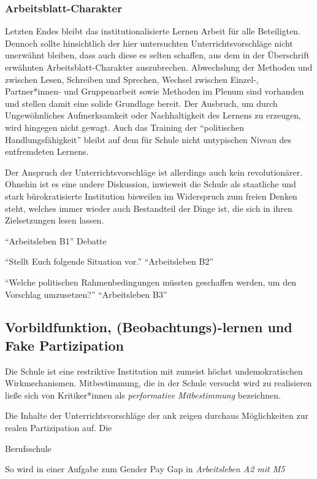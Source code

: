 \subsubsection{Arbeitsblatt-Charakter}
Letzten Endes bleibt das institutionalisierte Lernen Arbeit für alle Beteiligten. Dennoch sollte hinsichtlich der hier untersuchten Unterrichtsvorschläge nicht unerwähnt bleiben, dass auch diese es selten schaffen, aus dem in der Überschrift erwähnten Arbeitsblatt-Charakter auszubrechen. Abwechslung der Methoden und zwischen Lesen, Schreiben und Sprechen, Wechsel zwischen Einzel-, Partner*innen- und Gruppenarbeit sowie Methoden im Plenum sind vorhanden und stellen damit eine solide Grundlage bereit. Der Ausbruch, um durch Ungewöhnliches Aufmerksamkeit oder Nachhaltigkeit des Lernens zu erzeugen, wird hingegen nicht gewagt. 
Auch das Training der \enquote{politischen Handlungsfähigkeit} bleibt auf dem für Schule nicht untypischen Niveau des entfremdeten Lernens. 

Der Anspruch der Unterrichtsvorschläge ist allerdings auch kein revolutionärer. Ohnehin ist es eine andere Diskussion, inwieweit die Schule als staatliche und stark bürokratisierte Institution bisweilen im Widerspruch zum freien Denken steht, welches immer wieder auch Bestandteil der Dinge ist, die sich in ihren Zielsetzungen lesen lassen. 

\enquote{Arbeitsleben B1} Debatte

\enquote{Stellt Euch folgende Situation vor.} \enquote{Arbeitsleben B2}

\enquote{Welche politischen Rahmenbedingungen müssten geschaffen werden, um den Vorschlag umzusetzen?} \enquote{Arbeitsleben B3}

\subsection{Vorbildfunktion, (Beobachtungs)-lernen und Fake Partizipation \label{fakePartizipation}}
Die Schule ist eine restriktive Institution mit zumeist höchst undemokratischen Wirkmechanismen.
Mitbestimmung, die in der Schule versucht wird zu realisieren ließe sich von Kritiker*innen als \emph{performative Mitbestimmung} bezeichnen. 


Die Inhalte der Unterrichtsvorschläge der \gls{ank} zeigen durchaus Möglichkeiten zur realen Partizipation auf. Die  

Berufsschule 

So wird in einer Aufgabe zum Gender Pay Gap in \emph{Arbeitsleben A2 mit M5}


